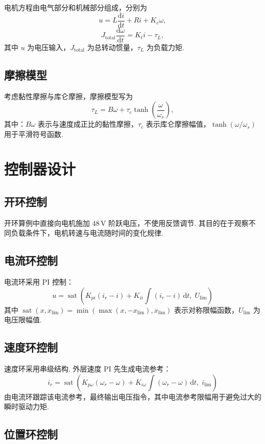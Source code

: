 \documentclass[a4paper, 12pt]{ctexart}
\newcommand{\sat}{\operatorname{sat}}
\begin{document}
电机方程由电气部分和机械部分组成，分别为
\[
  u = L\frac{\mathrm{d}i}{\mathrm{d}t} + Ri + K_e \omega,
\]
\[
  J_{\text{total}}\frac{\mathrm{d}\omega}{\mathrm{d}t} = K_t i - \tau_L,
\]
其中 $u$ 为电压输入，$J_{\text{total}}$ 为总转动惯量，$\tau_L$ 为负载力矩.


\subsection{摩擦模型}

考虑黏性摩擦与库仑摩擦，摩擦模型写为
\[
  \tau_L
  =
  B\omega +
  \tau_c \tanh\!\left(\frac{\omega}{\omega_s}\right),
\]
其中：$B\omega$ 表示与速度成正比的黏性摩擦，$\tau_c$ 表示库仑摩擦幅值，$\tanh(\omega/\omega_s)$ 用于平滑符号函数.

\section{控制器设计}

\subsection{开环控制}

开环算例中直接向电机施加 $48\,\mathrm{V}$ 阶跃电压，不使用反馈调节. 其目的在于观察不同负载条件下，电机转速与电流随时间的变化规律.

\subsection{电流环控制}

电流环采用 PI 控制：
\[
  u = \sat\!\left(K_{pi}(i_r - i) + K_{ii}\int (i_r - i)\,\mathrm{d}t,\; U_{\mathrm{lim}}\right)
\]
其中 $\sat(x, x_{\mathrm{lim}})=\min(\max(x,-x_{\mathrm{lim}}),x_{\mathrm{lim}})$ 表示对称限幅函数，$U_{\mathrm{lim}}$ 为电压限幅值.

\subsection{速度环控制}

速度环采用串级结构. 外层速度 PI 先生成电流参考：
\[
  i_r = \sat\!\left(K_{p\omega}(\omega_r-\omega) + K_{i\omega}\int(\omega_r-\omega)\,\mathrm{d}t,\; i_{\mathrm{lim}}\right)
\]
由电流环跟踪该电流参考，最终输出电压指令，其中电流参考限幅用于避免过大的瞬时驱动力矩.

\subsection{位置环控制}
\end{document}
